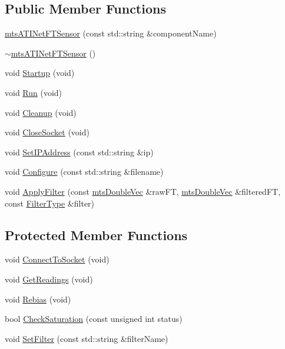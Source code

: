\subsection*{Public Member Functions}
\begin{DoxyCompactItemize}
\item 
\hyperlink{classmts_a_t_i_net_f_t_sensor_adf30efbe6a448cb9ca74dc734312f4b1}{mts\+A\+T\+I\+Net\+F\+T\+Sensor} (const std\+::string \&component\+Name)
\item 
\hyperlink{classmts_a_t_i_net_f_t_sensor_a10444ec7ab68c31dcbf0119756900920}{$\sim$mts\+A\+T\+I\+Net\+F\+T\+Sensor} ()
\item 
void \hyperlink{classmts_a_t_i_net_f_t_sensor_a0c0eb0990258a415063f5630c057489e}{Startup} (void)
\item 
void \hyperlink{classmts_a_t_i_net_f_t_sensor_a91e4aba10538d0e42c27748a8730cc20}{Run} (void)
\item 
void \hyperlink{classmts_a_t_i_net_f_t_sensor_a85035cf7e54de1a0924dad9ee70e3c73}{Cleanup} (void)
\item 
void \hyperlink{classmts_a_t_i_net_f_t_sensor_a51667a1895aa9427d4ac2b2204aac5ec}{Close\+Socket} (void)
\item 
void \hyperlink{classmts_a_t_i_net_f_t_sensor_a9b4e699e0de10d44d910ea5ae33cb346}{Set\+I\+P\+Address} (const std\+::string \&ip)
\item 
void \hyperlink{classmts_a_t_i_net_f_t_sensor_ac1340f0afc56a0b020c5fc4b4ab96cb0}{Configure} (const std\+::string \&filename)
\item 
void \hyperlink{classmts_a_t_i_net_f_t_sensor_a5b63083511d398a195992b3b1fae8893}{Apply\+Filter} (const \hyperlink{mts_vector_8h_af69167a5dc2ad33eb93965b9387d8403}{mts\+Double\+Vec} \&raw\+F\+T, \hyperlink{mts_vector_8h_af69167a5dc2ad33eb93965b9387d8403}{mts\+Double\+Vec} \&filtered\+F\+T, const \hyperlink{classmts_a_t_i_net_f_t_sensor_ac0b6761b0eee98b4413c5a153865c2ea}{Filter\+Type} \&filter)
\end{DoxyCompactItemize}
\subsection*{Protected Member Functions}
\begin{DoxyCompactItemize}
\item 
void \hyperlink{classmts_a_t_i_net_f_t_sensor_a391a74b9c0e746c8014df3df7958a7b2}{Connect\+To\+Socket} (void)
\item 
void \hyperlink{classmts_a_t_i_net_f_t_sensor_adbf21a545ccd22da52a765e93d469f1c}{Get\+Readings} (void)
\item 
void \hyperlink{classmts_a_t_i_net_f_t_sensor_a849f04c5faa61544bd1dc44546d65513}{Rebias} (void)
\item 
bool \hyperlink{classmts_a_t_i_net_f_t_sensor_a92d9acb0ae995a44ce904b84c055fabe}{Check\+Saturation} (const unsigned int status)
\item 
void \hyperlink{classmts_a_t_i_net_f_t_sensor_a15930377aaa14ba83a03dc94f193e943}{Set\+Filter} (const std\+::string \&filter\+Name)
\end{DoxyCompactItemize}
